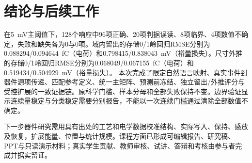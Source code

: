 \section{结论与后续工作}
在5~mV主阈值下，128个响应中96项正确、20项判据误读、8项临界、4项数值不确定，失败和缺失各为0与0项。域内留出的存储0/1岭回归RMSE分别为0.088294/0.094644~fC（电荷）和0.798415/0.838043~mV（裕量损失）。尺寸外推的存储0/1岭回归RMSE分别为0.068049/0.067155~fC（电荷）和0.519434/0.504929~mV（裕量损失）。
本次完成了限定自然语言映射、真实事件到器件源项传递、匹配参考定义、统一主矩阵、预测前冻结、独立留出/外推评分与受控扩展的一致证据链。原科学门槛、样本分母和全部失败保持不变。边界验证显示连续量稳定与分类稳定需要分别报告，不能以一次连续门槛通过清除全部数值不确定。

下一步器件研究需用具有出处的工艺和电学数据校准结构、实际写入、保持、感放及恢复，扩展能量、位置与统计规模。课程方面已形成可编辑报告、研究稿、PPT与只读演示材料；真实学生贡献、教师审核、试讲、答辩和考核由参与者完成并据实留证。
